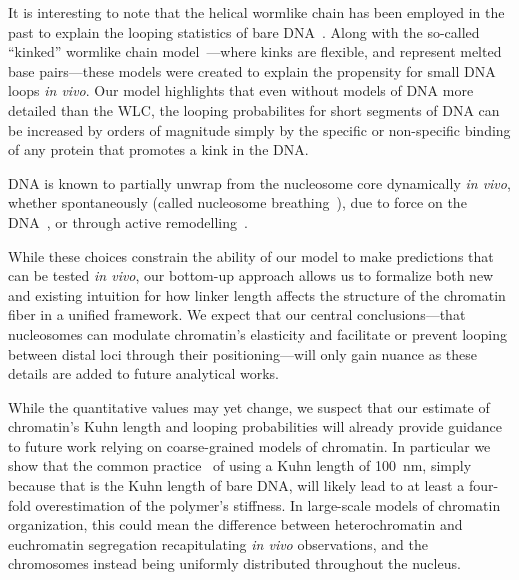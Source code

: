 \documentclass[%
 reprint,
superscriptaddress,
showpacs,preprintnumbers,
 amsmath,amssymb,
 aps,
 prl,
]{revtex4-1}
\begin{document}
It is interesting to note that the helical wormlike chain has been employed
    in the past to explain the looping statistics of bare DNA~\cite{shimada1984,
    liu2011a}.
Along with the so-called ``kinked'' wormlike chain model~\cite{wiggins2005,
    popov2005}---where kinks are flexible, and represent melted base
    pairs---these models were created to explain the propensity for small DNA
    loops \textit{in vivo}.
Our model highlights that even without models of DNA more detailed than the WLC,
    the looping probabilites for short segments of DNA can be increased by
    orders of magnitude simply by the specific or non-specific binding of any
    protein that promotes a kink in the DNA.\@

DNA is known to partially unwrap from the nucleosome core dynamically \textit{in
    vivo}, whether spontaneously (called nucleosome breathing~\cite{TODO}), due to
    force on the DNA~\cite{TODO}, or through active
    remodelling~\cite{dion2007,kulaeva2007,senavirathne2017}.

While these choices constrain the ability of our model to make predictions that
    can be tested \textit{in vivo}, our bottom-up approach allows us to
    formalize both new and existing intuition for how linker length affects the
    structure of the chromatin fiber in a unified framework.
We expect that our central conclusions---that nucleosomes can modulate
    chromatin's elasticity and facilitate or prevent looping between distal loci
    through their positioning---will only gain nuance as these details are added
    to future analytical works.

While the quantitative values may yet change, we suspect that our estimate of
    chromatin's Kuhn length and looping probabilities will already provide
    guidance to future work relying on coarse-grained models of chromatin.
In particular we show that the common practice~\cite{macphersonInPress,nuebler2018}
    of using a Kuhn length of \SI{100}{\nano\metre}, simply because that is the
    Kuhn length of bare DNA, will likely lead to at least a four-fold
    overestimation of the polymer's stiffness.
In large-scale models of chromatin organization, this could mean the difference
    between heterochromatin and euchromatin segregation recapitulating
    \textit{in vivo} observations, and the chromosomes instead being uniformly
    distributed throughout the nucleus.
\end{document}
